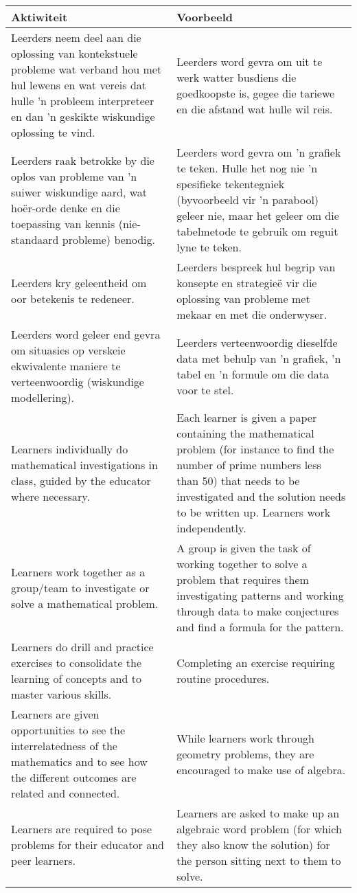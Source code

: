 \begin{table}[H]
  \begin{center}
    \begin{tabular}{|p{6.5cm}|p{6.5cm}|} \hline 
\textbf{Aktiwiteit} & \textbf{Voorbeeld} \\ \hline
Leerders neem deel aan die oplossing van kontekstuele probleme wat
verband hou met hul lewens en wat vereis dat hulle 'n probleem
interpreteer en dan 'n geskikte wiskundige oplossing te vind.
&
Leerders word gevra om uit te werk watter busdiens die goedkoopste is,
gegee die tariewe en die afstand wat hulle wil reis.
\\ \hline
Leerders raak betrokke by die oplos van probleme van 'n suiwer
wiskundige aard, wat ho\"{e}r-orde denke en die toepassing van kennis
(nie-standaard probleme) benodig.
&
Leerders word gevra om 'n grafiek te teken. Hulle het nog nie 'n
spesifieke tekentegniek (byvoorbeeld vir 'n parabool) geleer nie, maar
het geleer om die tabelmetode te gebruik om reguit lyne te teken.
\\ \hline
Leerders kry geleentheid om oor betekenis te redeneer.
&
Leerders bespreek hul begrip van konsepte en strategie\"{e} vir die
oplossing van probleme met mekaar en met die onderwyser.
\\ \hline
Leerders word geleer end gevra om situasies op verskeie ekwivalente
maniere te verteenwoordig (wiskundige modellering).
&
Leerders verteenwoordig dieselfde data met behulp van 'n grafiek, 'n
tabel en 'n formule om die data voor te stel.
\\ \hline
Learners individually do mathematical investigations in class, guided by the educator where necessary.  &
Each learner is given a paper containing the mathematical problem (for instance to find the number of prime numbers less than 50) that needs to be investigated and the solution needs to be written up. Learners work independently. \\ \hline
Learners work together as a group/team to investigate or solve a mathematical problem. &
A group is given the task of working together to solve a problem that requires them investigating patterns and working through data to make conjectures and find a formula for the pattern. \\ \hline
Learners do drill and practice exercises to consolidate the learning of concepts and to master various skills. &
Completing an exercise requiring routine procedures. \\ \hline
Learners are given opportunities to see the interrelatedness of the mathematics and to see how the different outcomes are related and connected.  &
While learners work through geometry problems, they are encouraged to make use of algebra. \\ \hline
Learners are required to pose problems for their educator and peer learners. &
Learners are asked to make up an algebraic word problem (for which they also know the solution) for the person sitting next to them to solve. \\ \hline


 \end{tabular}
\end{center}
\end{table}

